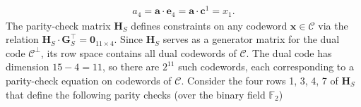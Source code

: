 \documentclass[conference,letterpaper]{IEEEtran}
\begin{document}
\begin{align}\label{eq:MessageSymbol}
a_4 = \boldsymbol{a}\cdot \boldsymbol{e}_4 = \boldsymbol{a}\cdot \boldsymbol{c}^1 = x_1.
\end{align}
The parity-check matrix \( \boldsymbol{H}_S \) defines constraints on any codeword \( \boldsymbol{x} \in \mathcal{C} \) via the relation \( \boldsymbol{H}_S \cdot \boldsymbol{G}_S^\top = \boldsymbol{0}_{11 \times 4} \). Since \( \boldsymbol{H}_S \) serves as a generator matrix for the dual code \( \mathcal{C}^\perp \), its row space contains all dual codewords of \( \mathcal{C} \). The dual code has dimension \( 15 - 4 = 11 \), so there are \( 2^{11} \) such codewords, each corresponding to a parity-check equation on codewords of \( \mathcal{C} \). Consider the four rows 1, 3, 4, 7 of $\boldsymbol{H}_S$ that define the following parity checks (over the binary field $\mathbb{F}_2$)
\end{document}
